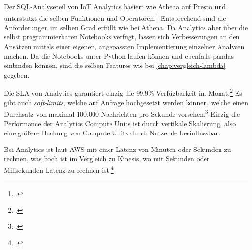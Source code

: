  \label{anhang:vergleich-iot-analytics}

Der \ac{SQL}-Analyseteil von IoT Analytics basiert wie Athena auf Presto und unterstützt die selben Funktionen und Operatoren.\footcite[Vgl.][]{AmazonWebServicesInc..o.J.au} Entsprechend sind die Anforderungen im selben Grad erfüllt wie bei Athena. Da \AWSIOT{} Analytics aber über die selbst programmierbaren Notebooks verfügt, lassen sich Verbesserungen an den Ansätzen mittels einer eigenen, angepassten Implementierung einzelner Analysen machen.
Da die Notebooks unter Python laufen können und ebenfalls pandas einbinden können, sind die selben Features wie bei \autoref{chap:vergleich-lambda} gegeben.

Die \ac{SLA} von \AWSIOT{} Analytics garantiert einzig die 99,9\% Verfügbarkeit im Monat.\footcite[Vgl.][]{AmazonWebServicesInc..2019f} Es gibt auch \textit{soft-limits}, welche auf Anfrage hochgesetzt werden können, welche einen Durchsatz von maximal 100.000 Nachrichten pro Sekunde vorsehen.\footcite[Vgl][]{AmazonWebServicesInc..o.J.av} Einzig die Performance der Analytics Compute Units ist durch vertikale Skalierung, also eine größere Buchung von Compute Units durch Nutzende beeinflussbar.

Bei \AWSIOT{} Analytics ist laut \ac{AWS} mit einer Latenz von Minuten oder Sekunden zu rechnen, was hoch ist im Vergleich zu Kinesis, wo mit Sekunden oder Milisekunden Latenz zu rechnen ist.\footcite[Vgl.][]{AmazonWebServicesInc..o.J.ax}